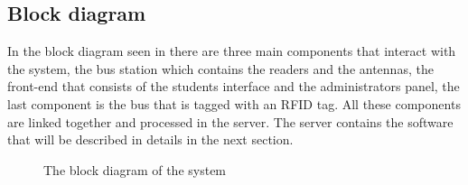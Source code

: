 \documentclass[a4paper,twoside]{IEEEtran}
\begin{document}
\subsection{Block diagram}
In the block diagram seen in  there are three main components that interact with the system, the bus station which contains the readers and the antennas, the front-end that consists of the students interface and the administrators panel, the last component is the bus that is tagged with an RFID tag. All these components are linked together and processed in the server. The server contains the software that will be described in details in the next section.
\begin{figure}
\centering
{}
\caption{The block diagram of the system}
\label{blockdiagram}
\end{figure}
\end{document}
